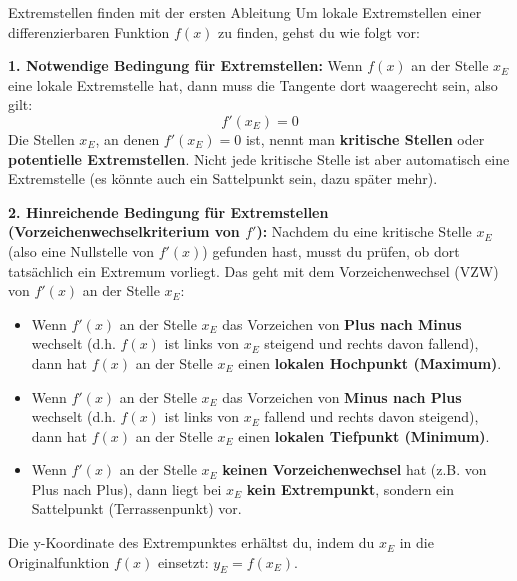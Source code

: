 \begin{merksatzumgebung}{Extremstellen finden mit der ersten Ableitung}
Um lokale Extremstellen einer differenzierbaren Funktion $f(x)$ zu finden, gehst du wie folgt vor:

\textbf{1. Notwendige Bedingung für Extremstellen:}
Wenn $f(x)$ an der Stelle $x_E$ eine lokale Extremstelle hat, dann muss die Tangente dort waagerecht sein, also gilt:
\[ f'(x_E) = 0 \]
Die Stellen $x_E$, an denen $f'(x_E)=0$ ist, nennt man \textbf{kritische Stellen} oder \textbf{potentielle Extremstellen}. Nicht jede kritische Stelle ist aber automatisch eine Extremstelle (es könnte auch ein Sattelpunkt sein, dazu später mehr).

\textbf{2. Hinreichende Bedingung für Extremstellen (Vorzeichenwechselkriterium von $f'$):}
Nachdem du eine kritische Stelle $x_E$ (also eine Nullstelle von $f'(x)$) gefunden hast, musst du prüfen, ob dort tatsächlich ein Extremum vorliegt. Das geht mit dem Vorzeichenwechsel (VZW) von $f'(x)$ an der Stelle $x_E$:
\begin{itemize}
    \item Wenn $f'(x)$ an der Stelle $x_E$ das Vorzeichen von \textbf{Plus nach Minus} wechselt (d.h. $f(x)$ ist links von $x_E$ steigend und rechts davon fallend), dann hat $f(x)$ an der Stelle $x_E$ einen \textbf{lokalen Hochpunkt (Maximum)}.
    \item Wenn $f'(x)$ an der Stelle $x_E$ das Vorzeichen von \textbf{Minus nach Plus} wechselt (d.h. $f(x)$ ist links von $x_E$ fallend und rechts davon steigend), dann hat $f(x)$ an der Stelle $x_E$ einen \textbf{lokalen Tiefpunkt (Minimum)}.
    \item Wenn $f'(x)$ an der Stelle $x_E$ \textbf{keinen Vorzeichenwechsel} hat (z.B. von Plus nach Plus), dann liegt bei $x_E$ \textbf{kein Extrempunkt}, sondern ein Sattelpunkt (Terrassenpunkt) vor.
\end{itemize}
Die y-Koordinate des Extrempunktes erhältst du, indem du $x_E$ in die Originalfunktion $f(x)$ einsetzt: $y_E = f(x_E)$.
\end{merksatzumgebung}

